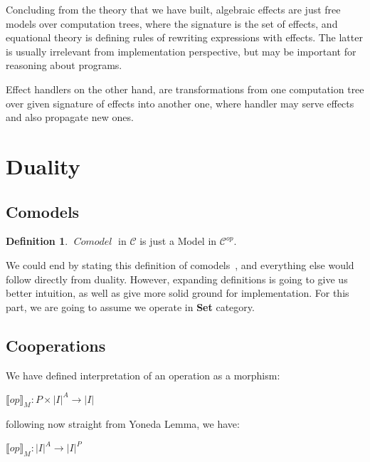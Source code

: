 \documentclass[declaration,shortabstract]{iithesis}
\theoremstyle{definition} \newtheorem{definition}{Definition}[chapter]
\theoremstyle{remark} \newtheorem{remark}[definition]{Observation}
\theoremstyle{plain} \newtheorem{theorem}[definition]{Theorem}
\theoremstyle{plain} \newtheorem{lemma}[definition]{Lemma}
\newcommand{\mathVar}[1]{{\operatorname{\mathit{#1}}}}
\begin{document}
Concluding from the theory that we have built, algebraic effects are just free
models over computation trees, where the signature is the set of effects, and
equational theory is defining rules of rewriting expressions with effects.
The latter is usually irrelevant from implementation perspective, but may be
important for reasoning about programs.

Effect handlers on the other hand, are transformations from one computation
tree over given signature of effects into another one, where handler may serve
effects and also propagate new ones.

\section{Duality}\label{sec:duality}
    \subsection{Comodels}

    \begin{definition}
        $\mathVar{Comodel}$ in $\mathcal{C}$ is just a Model in $ \mathcal{C}^{op} $.
    \end{definition}

    We could end by stating this definition of comodels~\cite{comodels}, and
    everything else would follow directly from duality. However, expanding
    definitions is going to give us better intuition, as well as give more solid
    ground for implementation. For this part, we are going to assume we operate
    in \textbf{Set} category.

    \subsection{Cooperations}

    We have defined interpretation of an operation as a morphism:

    \begin{center}
        {$\displaystyle {\llbracket op \rrbracket}_M : P \times {|I|}^{A} \rightarrow |I| $}
    \end{center}

    \noindent
    following now straight from Yoneda Lemma, we have:

    \begin{center}
        {$\displaystyle {\llbracket op \rrbracket}_M : {|I|}^{A} \rightarrow |I|^{P} $}
    \end{center}
\end{document}

